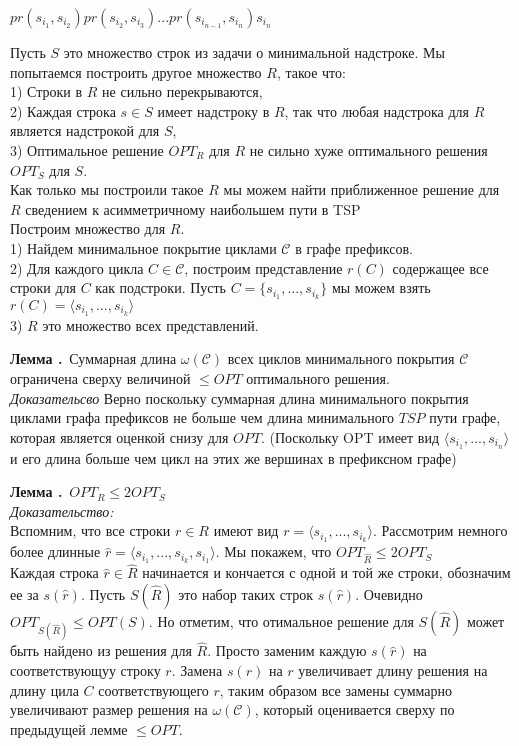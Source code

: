 \documentclass[11pt,a4paper]{article}
\newcommand\ifnonempty[2]{\ifthenelse{\equal{#1}{}}{}{#2}}
\newcounter{lem}
\newcommand{\lem}[1][]{\smallskip\par\hangafter=1\normalsize\textbf{Лемма \refstepcounter{lem}\thelem\ifnonempty{#1}{ (#1)}.}~}
\begin{document}
\begin{center}
 $pr(s_{i_1}, s_{i_2})pr(s_{i_2}, s_{i_3}) ... pr(s_{i_{n - 1}}, s_{i_n}) s_{i_n}$ \\
\end{center}
Пусть $S$ это множество строк из задачи о минимальной надстроке. Мы попытаемся построить другое множество $R$, такое что:\\
1) Строки в $R$ не сильно перекрываются,\\
2) Каждая строка $s \in S$ имеет надстроку в $R$, так что любая надстрока для $R$ является надстрокой для $S$,\\
3) Оптимальное решение $OPT_R$ для $R$ не сильно хуже оптимального решения $OPT_S$ для $S$.\\
Как только мы построили такое $R$ мы можем найти приближенное решение для $R$ сведением к асимметричному наибольшем пути в TSP\\
Построим множество для $R$.\\
1) Найдем минимальное покрытие циклами $\mathcal{C}$ в графе префиксов.\\
2) Для каждого цикла $C \in \mathcal{C}$, построим представление $r(C)$ содержащее все строки для $C$ как подстроки.
Пусть $C = \{s_{i_1}, ..., s_{i_k}\}$ мы можем взять $r(C) = \langle s_{i_1}, ..., s_{i_k} \rangle$\\
3) $R$ это множество всех представлений.\\


\lem Суммарная длина $\omega(\mathcal{C})$ всех циклов минимального покрытия $\mathcal{C}$ ограничена сверху величиной $\le OPT$ оптимального решения.\\
\textit{Доказательсво} Верно поскольку суммарная длина минимального покрытия циклами графа префиксов не больше чем
длина минимального $TSP$ пути графе, которая является оценкой снизу для $OPT$. (Поскольку OPT имеет вид  $\langle s_{i_1}, ..., s_{i_n} \rangle$
 и его длина больше чем цикл на этих же вершинах в префиксном графе)

\lem $OPT_R \le 2OPT_S$\\
\textit{Доказательство:}\\
Вспомним, что все строки $r \in R$ имеют вид $r = \langle  s_{i_1}, ..., s_{i_k} \rangle$. Рассмотрим немного более длинные
$\hat{r} = \langle s_{i_1}, ..., s_{i_k}, s_{i_1} \rangle$. Мы покажем, что $OPT_{\hat{R}} \le 2 OPT_S$\\
Каждая строка $\hat{r} \in \hat{R}$ начинается и кончается с одной и той же строки, обозначим ее за $s(\hat{r})$. Пусть $S(\hat{R})$ это
набор таких строк $s(\hat{r})$. Очевидно $OPT_{S(\hat{R})} \le OPT(S)$. Но отметим, что отимальное решение для $S(\hat{R})$ может быть найдено
из решения для $\hat{R}$. Просто заменим каждую $s(\hat{r})$ на соответствующуу строку $r$. Замена $s(r)$ на $r$ увеличивает длину решения
на длину цила $C$ соответствующего $r$, таким образом все замены суммарно увеличивают размер решения на $\omega(\mathcal{C})$, который оценивается
сверху по предыдущей лемме $\le OPT$.
\end{document}
